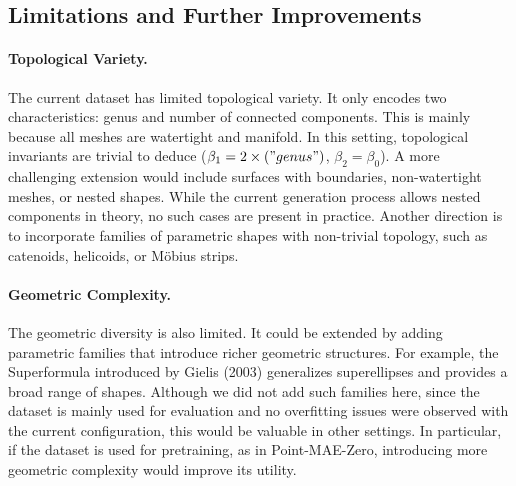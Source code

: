 \subsection{Limitations and Further Improvements}

\paragraph{Topological Variety.} 
The current dataset has limited topological variety. It only encodes two characteristics: genus and number of connected components. This is mainly because all meshes are watertight and manifold. In this setting, topological invariants are trivial to deduce ($\beta_1= 2 \times \text("genus")$, $\beta_2=\beta_0$). A more challenging extension would include surfaces with boundaries, non-watertight meshes, or nested shapes. While the current generation process allows nested components in theory, no such cases are present in practice. Another direction is to incorporate families of parametric shapes with non-trivial topology, such as catenoids, helicoids, or Möbius strips.


\paragraph{Geometric Complexity.} The geometric diversity is also limited. It could be extended by adding parametric families that introduce richer geometric structures. For example, the Superformula introduced by Gielis (2003) \cite{superformula} generalizes superellipses and provides a broad range of shapes. Although we did not add such families here, since the dataset is mainly used for evaluation and no overfitting issues were observed with the current configuration, this would be valuable in other settings. In particular, if the dataset is used for pretraining, as in Point-MAE-Zero, introducing more geometric complexity would improve its utility.


